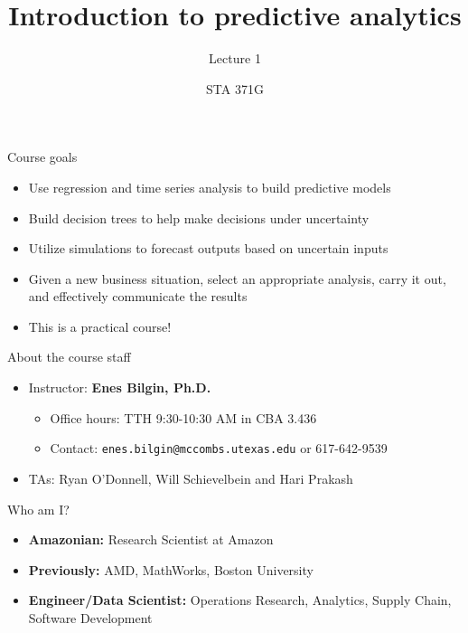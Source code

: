 \documentclass{beamer}\usepackage[]{graphicx}\usepackage[]{color}
\title{Introduction to predictive analytics}
\subtitle{Lecture 1}
\author{STA 371G}
\begin{document}
  
  

  \frame{\maketitle}



  \begin{darkframes}
    \begin{frame}{Course goals}
      \begin{itemize}
        \item Use regression and time series analysis to build predictive models
        \item Build decision trees to help make decisions under uncertainty
        \item Utilize simulations to forecast outputs based on uncertain inputs
        \item Given a new business situation, select an appropriate analysis, carry it out, and effectively communicate the results
        \item \alert{This is a practical course!}
      \end{itemize}
    \end{frame}

    \begin{frame}{About the course staff}
      \begin{itemize}
        \item Instructor: \textbf{Enes Bilgin, Ph.D.}
          \begin{itemize}
            \item Office hours: TTH 9:30-10:30 AM in CBA 3.436
            \item Contact: \texttt{enes.bilgin@mccombs.utexas.edu} or 617-642-9539
          \end{itemize}
        \item TAs: Ryan O'Donnell, Will Schievelbein and Hari Prakash
      \end{itemize}
    \end{frame}

    \begin{frame}{Who am I?}
      \begin{itemize}
        \item \textbf{Amazonian:} Research Scientist at Amazon
        \item \textbf{Previously:} AMD, MathWorks, Boston University
        \item \textbf{Engineer/Data Scientist:} Operations Research, Analytics, Supply Chain, Software Development
      \end{itemize}
    \end{frame}


\end{darkframes}
\end{document}
